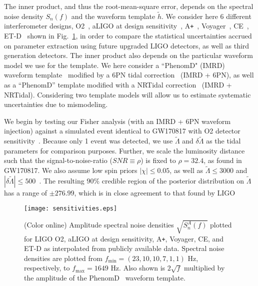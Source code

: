 \documentclass[prd,twocolumn,nofootinbib,superscriptaddress,amsmath,amssymb]{revtex4-1}
\begin{document}
The inner product, and thus the root-mean-square error, depends on the spectral noise density $S_{n}(f)$ and the waveform template $\tilde{h}$. We consider here 6 different interferometer designs, O2~\cite{aLIGO}, aLIGO at design sensitivity~\cite{aLIGO}, A\texttt{+}~\cite{Ap_Voyager_CE}, Voyager~\cite{Ap_Voyager_CE}, CE~\cite{ET}, ET-D~\cite{Ap_Voyager_CE} shown in Fig.~\ref{fig:sensitivities}, in order to compare the statistical uncertainties accrued on parameter extraction using future upgraded LIGO detectors, as well as third generation detectors. The inner product also depends on the particular waveform model we use for the template. We here consider a ``PhenomD" (IMRD) waveform template~\cite{PhenomDI,PhenomDII} modified by a 6PN tidal correction~\cite{Wade:tidalCorrections} (IMRD + 6PN), as well as a ``PhenomD'' template modified with a NRTidal correction~\cite{Samajdar:NRTidal} (IMRD + NRTidal). Considering two template models will allow us to estimate systematic uncertainties due to mismodeling. 

We begin by testing our Fisher analysis (with an IMRD + 6PN waveform injection) against a simulated event identical to GW170817 with O2 detector sensitivity~\cite{aLIGO}. Because only 1 event was detected, we use $\tilde\Lambda$ and $\delta\tilde\Lambda$ as the tidal parameters for comparison purposes. Further, we scale the luminosity distance such that the signal-to-noise-ratio ($SNR \equiv \rho$) is fixed to $\rho=32.4$, as found in GW170817. We also assume low spin priors $|\chi| \leq 0.05$, as well as $\tilde{\Lambda} \leq 3000$ and $|\delta \tilde{\Lambda}| \leq 500$~\cite{Wade:LambdaPriors}. The resulting $90\%$ credible region of the posterior distribution on $\tilde{\Lambda}$ has a range of $\pm 276.99$, which is in close agreement to that found by LIGO~\cite{TheLIGOScientific:2017qsa,Abbott2018}

\begin{figure}
\begin{center} 
\texttt{[image: sensitivities.eps]}
\end{center}
\caption{(Color online)
Amplitude spectral noise densities $\sqrt{S_n^A(f)}$ plotted for LIGO O2, aLIGO at design sensitivity, A\texttt{+}, Voyager, CE, and ET-D as interpolated from publicly available data.
Spectral noise densities are plotted from $f_{\text{min}}=(23,10,10,7,1,1) \text{ Hz}$, respectively, to $f_{\text{max}}=1649 \text{ Hz}$.
Also shown is $2 \sqrt{f}$ multiplied by the amplitude of the PhenomD~\cite{PhenomDI,PhenomDII} waveform template.
}
\label{fig:sensitivities}
\end{figure}
\end{document}
